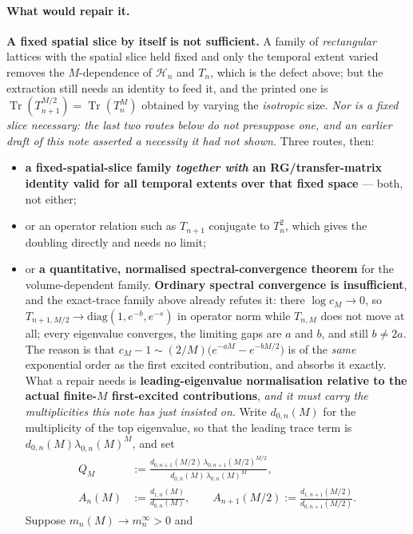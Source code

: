 \documentclass[11pt]{article}
\newcommand{\Hil}{\mathcal H}
\begin{document}
\paragraph{What would repair it.} \textbf{A fixed spatial slice by itself is not
sufficient.} A family of \emph{rectangular} lattices with the spatial slice held fixed
and only the temporal extent varied removes the $M$-dependence of $\Hil_n$ and $T_n$,
which is the defect above; but the extraction still needs an identity to feed it, and
the printed one is $\operatorname{Tr}(T_{n+1}^{M/2})=\operatorname{Tr}(T_n^{M})$
obtained by varying the \emph{isotropic} size. \emph{Nor is a fixed slice
necessary: the last two routes below do not presuppose one, and an earlier draft of this
note asserted a necessity it had not shown.} Three routes, then:
\begin{itemize}\setlength{\itemsep}{0pt}
\item \textbf{a fixed-spatial-slice family \emph{together with} an RG/transfer-matrix
identity valid for all temporal extents over that fixed space} --- both, not either;
\item or an operator relation such as $T_{n+1}$ conjugate to $T_n^2$, which gives the
doubling directly and needs no limit;
\item or \textbf{a quantitative, normalised spectral-convergence theorem} for the
volume-dependent family. \textbf{Ordinary spectral convergence is insufficient}, and
the exact-trace family above already refutes it: there $\log c_M\to0$, so
$T_{n+1,M/2}\to\mathrm{diag}(1,e^{-b},e^{-s})$ in operator norm while $T_{n,M}$ does not
move at all; every eigenvalue converges, the limiting gaps are $a$ and $b$, and still
$b\neq2a$. The reason is that $c_M-1\sim(2/M)\bigl(e^{-aM}-e^{-bM/2}\bigr)$ is of the
\emph{same} exponential order as the first excited contribution, and absorbs it exactly.
What a repair needs is
\textbf{leading-eigenvalue normalisation relative to the actual finite-$M$
first-excited contributions}, \emph{and it must carry the multiplicities this
note has just insisted on}. Write $d_{0,n}(M)$ for the multiplicity of the top
eigenvalue, so that the leading trace term is $d_{0,n}(M)\lambda_{0,n}(M)^M$, and set
\[
 \begin{aligned}
 Q_M&:=\frac{d_{0,n+1}(M/2)\,\lambda_{0,n+1}(M/2)^{M/2}}
 {d_{0,n}(M)\,\lambda_{0,n}(M)^{M}},\\
 A_n(M)&:=\frac{d_{1,n}(M)}{d_{0,n}(M)},\qquad
 A_{n+1}(M/2):=\frac{d_{1,n+1}(M/2)}{d_{0,n+1}(M/2)} .
 \end{aligned}
\]
Suppose $m_n(M)\to m_n^\infty>0$ and

\end{itemize}
\end{document}

